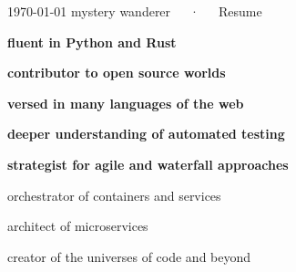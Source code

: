 \documentclass[18pt, letterpaper]{awesome-cv}
\begin{document}
\makecvheader[C]

\makecvfooter
  {\today}
  {mystery wanderer~~~·~~~Resume}
  {\thepage}


\begin{center}
\end{center}




\begin{cventries}
\begin{cvitems}
    
    \item{\textbf{fluent in Python and Rust}}
    
    \item{\textbf{contributor to open source worlds}}
    
    \item{\textbf{versed in many languages of the web}}
    
    \item{\textbf{deeper understanding of automated testing}}
    
    \item{\textbf{strategist for agile and waterfall approaches}}

\end{cvitems}
\end{cventries}

\begin{cventries}

{
\begin{cvitems}
    \item{orchestrator of containers and services}
    \item{architect of microservices}
    \item{creator of the universes of code and beyond}
\end{cvitems}
}

\end{cventries}
\end{document}
